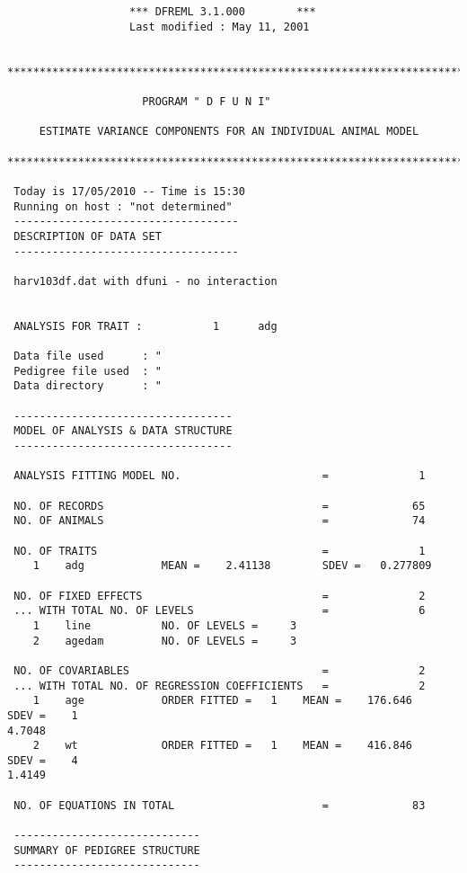 \documentclass[titlepage]{article}  %
\begin{document}
\begin{verbatim}
                   *** DFREML 3.1.000        ***
                   Last modified : May 11, 2001   


********************************************************************************

                     PROGRAM " D F U N I" 
  
     ESTIMATE VARIANCE COMPONENTS FOR AN INDIVIDUAL ANIMAL MODEL

****************************************************************************KM**

 Today is 17/05/2010 -- Time is 15:30
 Running on host : "not determined" 
 -----------------------------------
 DESCRIPTION OF DATA SET
 -----------------------------------
  
 harv103df.dat with dfuni - no interaction                                      
 
  
 ANALYSIS FOR TRAIT :           1      adg         
  
 Data file used      : "
 Pedigree file used  : "
 Data directory      : "
  
 ----------------------------------
 MODEL OF ANALYSIS & DATA STRUCTURE
 ----------------------------------
  
 ANALYSIS FITTING MODEL NO.                      =              1
  
 NO. OF RECORDS                                  =             65
 NO. OF ANIMALS                                  =             74
  
 NO. OF TRAITS                                   =              1
    1    adg            MEAN =    2.41138        SDEV =   0.277809    
  
 NO. OF FIXED EFFECTS                            =              2
 ... WITH TOTAL NO. OF LEVELS                    =              6
    1    line           NO. OF LEVELS =     3
    2    agedam         NO. OF LEVELS =     3
  
 NO. OF COVARIABLES                              =              2
 ... WITH TOTAL NO. OF REGRESSION COEFFICIENTS   =              2
    1    age            ORDER FITTED =   1    MEAN =    176.646      SDEV =    1
4.7048    
    2    wt             ORDER FITTED =   1    MEAN =    416.846      SDEV =    4
1.4149    
  
 NO. OF EQUATIONS IN TOTAL                       =             83
  
 -----------------------------
 SUMMARY OF PEDIGREE STRUCTURE
 -----------------------------
  

\end{verbatim}
\end{document}
